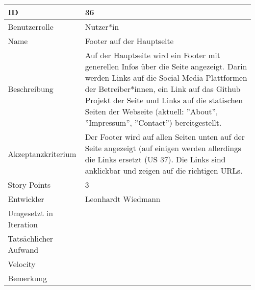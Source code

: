 \begin{tabularx}{\textwidth}{|p{}|X|}
	\hline
	ID & 36\\
	\hline
	Benutzerrolle & Nutzer*in\\
	\hline
	Name & Footer auf der Hauptseite\\
	\hline
	Beschreibung & Auf der Hauptseite wird ein Footer mit generellen Infos über die Seite angezeigt. Darin werden Links auf die Social Media Plattformen der Betreiber*innen, ein Link auf das Github Projekt der Seite und Links auf die statischen Seiten der Webseite (aktuell: ''About'', ''Impressum'', ''Contact'') bereitgestellt.\\
	\hline
	Akzeptanzkriterium & Der Footer wird auf allen Seiten unten auf der Seite angezeigt (auf einigen werden allerdings die Links ersetzt (US 37). Die Links sind anklickbar und zeigen auf die richtigen URLs.\\
	\hline
	Story Points & 3\\
	\hline
	Entwickler & Leonhardt Wiedmann\\
	\hline
	Umgesetzt in Iteration & \\
	\hline
	Tatsächlicher Aufwand & \\
	\hline
	Velocity & \\
	\hline
	Bemerkung & \\
	\hline
\end{tabularx}
\vspace{20pt}
